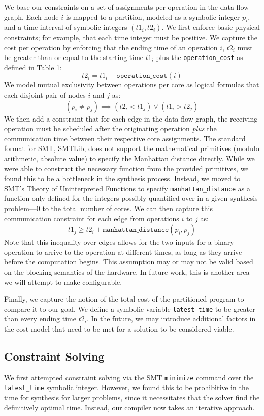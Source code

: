 \documentclass{sig-alternate-05-2015}
\begin{document}
We base our constraints on a set of assignments per operation in the data flow graph. Each node $i$ is mapped to a partition, modeled as a symbolic integer $p_i$, and a time interval of symbolic integers $(t1_i, t2_i)$. We first enforce basic physical constraints; for example, that each time integer must be positive. We capture the cost per operation by enforcing that the ending time of an operation $i$, $t2_i$ must be greater than or equal to the starting time $t1_i$ plus the \texttt{operation\_cost} as defined in Table 1:
$$t2_i = t1_i + \texttt{operation\_cost}(i)$$
We model mutual exclusivity between operations per core as logical formulas that each disjoint pair of nodes $i$ and $j$ as:
$$(p_i \neq p_j) \implies (t2_i < t1_j) \vee (t1_i > t2_j)$$
We then add a constraint that for each edge in the data flow graph, the receiving operation must be scheduled after the originating operation \emph{plus} the communication time between their respective core assignments. The standard format for SMT, SMTLib, does not support the mathematical primitives (modulo arithmetic, absolute value) to specify the Manhattan distance directly. While we were able to construct the necessary function from the provided primitives, we found this to be a bottleneck in the synthesis process. Instead, we moved to SMT's Theory of Uninterpreted Functions to specify \texttt{manhattan\_distance} as a function only defined for the integers possibly quantified over in a given synthesis problem---0 to the total number of cores. We can then capture this communication constraint for each edge from operations $i$ to $j$ as:
$$t1_j \geq t2_i + \texttt{manhattan\_distance}(p_i, p_j)$$
Note that this inequality over edges allows for the two inputs for a binary operation to arrive to the operation at different times, as long as they arrive before the computation begins. This assumption may or may not be valid based on the blocking semantics of the hardware. In future work, this is another area we will attempt to make configurable.

Finally, we capture the notion of the total cost of the partitioned program to compare it to our goal. We define a symbolic variable \texttt{latest\_time} to be greater than every ending time $t2_i$. In the future, we may introduce additional factors in the cost model that need to be met for a solution to be considered viable. 

\subsection{Constraint Solving}
We first attempted constraint solving via the SMT \texttt{minimize} command over the \texttt{latest\_time} symbolic integer. However, we found this to be prohibitive in the time for synthesis for larger problems, since it necessitates that the solver find the definitively optimal time. Instead, our compiler now takes an iterative approach.
\end{document}
